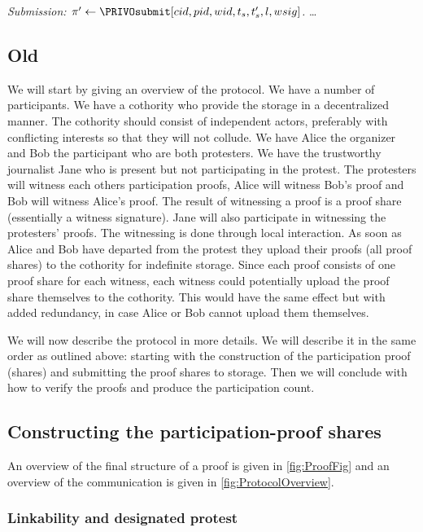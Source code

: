 
\emph{Submission: \(\pi'\gets \PRIVOsubmit[cid, pid, wid, t_s, t_s', l, 
    wsig]\).}
\dots


\subsection{Old}

We will start by giving an overview of the protocol.
We have a number of participants.
We have a cothority who provide the storage in a decentralized manner.
The cothority should consist of independent actors, preferably with conflicting 
interests so that they will not collude.
We have Alice the organizer and Bob the participant who are both protesters.
We have the trustworthy journalist Jane who is present but not participating in 
the protest.
The protesters will witness each others participation proofs, \eg Alice will 
witness Bob's proof and Bob will witness Alice's proof.
The result of witnessing a proof is a proof share (essentially a witness 
signature).
Jane will also participate in witnessing the protesters' proofs.
The witnessing is done through local interaction.
As soon as Alice and Bob have departed from the protest they upload their proofs 
(\ie all proof shares) to the cothority for indefinite storage.
Since each proof consists of one proof share for each witness, each witness 
could potentially upload the proof share themselves to the cothority.
This would have the same effect but with added redundancy, in case Alice or Bob 
cannot upload them themselves.

We will now describe the protocol in more details.
We will describe it in the same order as outlined above:
starting with the construction of the participation proof (shares) and 
submitting the proof shares to storage.
Then we will conclude with how to verify the proofs and produce the 
participation count.

\subsection{Constructing the participation-proof shares}

An overview of the final structure of a proof is given in \cref{fig:ProofFig} 
and an overview of the communication is given in \cref{fig:ProtocolOverview}.

\subsubsection{Linkability and designated protest}

